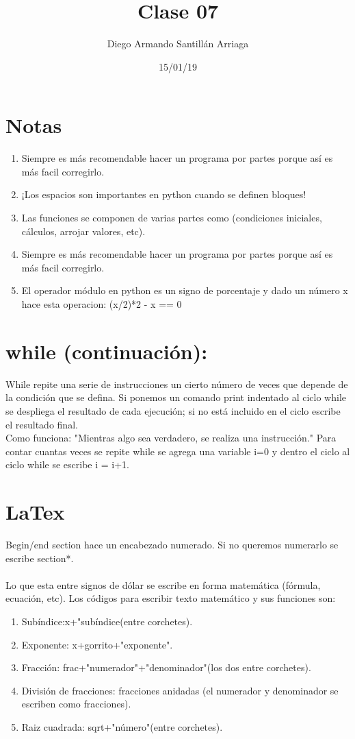 \documentclass[letterpaper, 12pt, oneside]{article}%
\title{\Huge Clase 07}
\author{Diego Armando Santillán Arriaga}
\date{15/01/19}
\begin{document}
	\maketitle
	\newpage
\section*{Notas}
\begin{enumerate}
\item{Siempre es más recomendable hacer un programa por partes porque así es más facil corregirlo.}

\item{¡Los espacios son importantes en python cuando se definen bloques!}

\item{Las funciones se componen de varias partes como (condiciones iniciales, cálculos, arrojar valores, etc).}


\item{Siempre es más recomendable hacer un programa por partes porque así es más facil corregirlo.}

\item{El operador módulo en python es un signo de porcentaje y dado un número x hace esta operacion: (x/2)*2 - x == 0}
\end{enumerate}
\section{while (continuación):}
While repite una serie de instrucciones un cierto número de veces que depende de la condición que se defina. Si ponemos un comando print indentado al ciclo while se despliega el resultado de cada ejecución; si no está incluido en el ciclo escribe el resultado final. 
\\
Como funciona:
"Mientras algo sea verdadero, se realiza una instrucción."
Para contar cuantas veces se repite while se agrega una variable i=0 y dentro el ciclo al ciclo while se escribe i = i+1.
	 
	
\section{LaTex}
Begin/end section hace un encabezado numerado. Si no queremos numerarlo se escribe section*.
\\\\
Lo que esta entre signos de dólar se escribe en forma matemática (fórmula, ecuación, etc). Los códigos para escribir texto matemático y sus funciones son:
\begin{enumerate}
	\item{Subíndice:x+"subíndice(entre corchetes).}
	\item{Exponente: x+gorrito+"exponente".}
	\item{Fracción:
	frac+"numerador"+"denominador"(los dos entre corchetes).}
	\item{División de fracciones:
	fracciones anidadas (el numerador y denominador se escriben como fracciones).}
	\item{Raiz cuadrada: sqrt+"número"(entre corchetes).}
	
\end{enumerate} 
	
\end{document}
